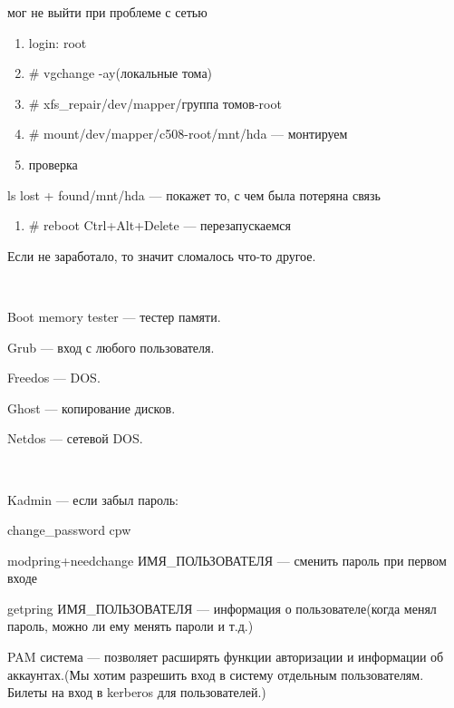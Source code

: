 мог не выйти при проблеме с сетью
\begin{enumerate}
	\item \par 
	login: root 
	
	\item \par 
	\# vgchange -ay(локальные тома)
	\item \par 
	\# xfs\_repair/dev/mapper/группа томов-root
	\item \par 
	\# mount/dev/mapper/c508-root/mnt/hda — монтируем
	\item \par 
	проверка 
	
\end{enumerate}
\par 
ls lost + found/mnt/hda — покажет то, с чем была
потеряна связь
\begin{enumerate}
	\item \par 
	\# reboot Ctrl+Alt+Delete — перезапускаемся
\end{enumerate}
\par 
Если не заработало, то значит сломалось
что-то другое.
\par 
\\

\par 
Boot memory tester — тестер памяти.
\par 
Grub — вход с любого пользователя.
\par 
Freedos — DOS.
\par 
Ghost — копирование дисков.
\par 
Netdos — сетевой DOS.
\par 
\\

\par 
Kadmin — если забыл пароль:
\par 
change\_password cpw
\par 
modpring+needchange ИМЯ\_ПОЛЬЗОВАТЕЛЯ — сменить
пароль при первом входе
\par 
getpring ИМЯ\_ПОЛЬЗОВАТЕЛЯ — информация о
пользователе(когда менял пароль, можно
ли ему менять пароли и т.д.)
\par 
PAM система — позволяет расширять функции
авторизации и информации об аккаунтах.(Мы
хотим разрешить вход в систему отдельным
пользователям. Билеты на вход в kerberos
для пользователей.)
\par 
\\

